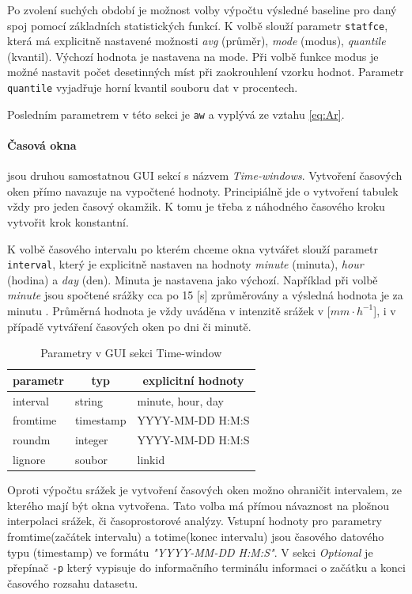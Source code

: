 \documentclass[a4paper,12pt,oneside]{report}
\begin{document}
Po zvolení suchých období je možnost volby výpočtu výsledné baseline pro daný spoj pomocí základních statistických funkcí. K volbě slouží parametr \texttt{statfce}, která má explicitně nastavené možnosti \emph{avg} (průměr), \emph{mode} (modus), \emph{quantile} (kvantil). Výchozí hodnota je nastavena na mode. Při volbě funkce modus je možné nastavit počet desetinných míst při zaokrouhlení vzorku hodnot. Parametr \texttt{quantile}  vyjadřuje horní kvantil souboru dat v procentech. 

Posledním parametrem v této sekci je \texttt{aw} a vyplývá ze vztahu \ref{eq:Ar}.


\paragraph*{Časová okna} jsou druhou samostatnou GUI sekcí s názvem \textit{Time-windows}. Vytvoření časových oken přímo navazuje na vypočtené hodnoty. Principiálně jde o vytvoření tabulek vždy pro jeden časový okamžik. K tomu je třeba z náhodného časového kroku vytvořit krok konstantní.

K volbě časového intervalu po kterém chceme okna vytvářet slouží parametr \texttt{interval}, který je explicitně nastaven na hodnoty \emph{minute} (minuta), \emph{hour} (hodina) a \emph{day} (den). Minuta je nastavena jako výchozí.  Například při volbě \emph{minute} jsou spočtené srážky cca po 15 [s] zprůměrovány a výsledná hodnota je za minutu . Průměrná hodnota je vždy uváděna v intenzitě srážek v [$mm \cdot h^{-1}$], i v případě vytváření časových oken po dni či minutě.
\begin{table}[h]
\centering
\begin{tabular}{|lll|}
\hline
\multicolumn{1}{|c}{parametr} & \multicolumn{1}{c}{typ} & \multicolumn{1}{c|}{explicitní hodnoty} \\ \hline\hline
interval                               & string                  & minute, hour, day             \\
fromtime                               & timestamp               & YYYY-MM-DD H:M:S              \\
roundm                                 & integer                 & YYYY-MM-DD H:M:S              \\
lignore                                & soubor                  & linkid                        \\ \hline
\end{tabular}
\caption{Parametry v GUI sekci Time-window}
\label{my-label}
\end{table}
Oproti výpočtu srážek je vytvoření časových oken možno ohraničit intervalem, ze kterého mají být okna vytvořena. Tato volba má přímou návaznost na plošnou interpolaci srážek, či časoprostorové analýzy. Vstupní hodnoty pro parametry fromtime(začátek intervalu) a totime(konec intervalu) jsou časového datového typu (timestamp) ve formátu \emph{"YYYY-MM-DD H:M:S"}. V sekci \textit{Optional} je přepínač \texttt{-p} který vypisuje do informačního terminálu informaci o začátku a konci časového rozsahu datasetu.
\end{document}
